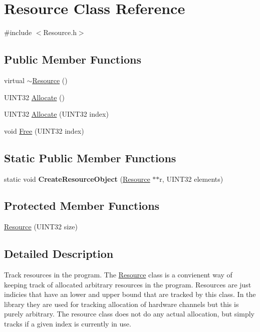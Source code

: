 \hypertarget{classResource}{\section{\-Resource \-Class \-Reference}
\label{classResource}
}


{\ttfamily \#include $<$\-Resource.\-h$>$}

\subsection*{\-Public \-Member \-Functions}
\begin{DoxyCompactItemize}
\item 
virtual \hyperlink{classResource_a0e5ec475e2601bdb33644468e86f6f10}{$\sim$\-Resource} ()
\item 
\-U\-I\-N\-T32 \hyperlink{classResource_ae3a993c7a656e97b51c77b1f7698ef3c}{\-Allocate} ()
\item 
\-U\-I\-N\-T32 \hyperlink{classResource_a502ca9f878a2c538fd0db89621033140}{\-Allocate} (\-U\-I\-N\-T32 index)
\item 
void \hyperlink{classResource_a1f8793fe4ecfcd6c4ae1417c3d0745ca}{\-Free} (\-U\-I\-N\-T32 index)
\end{DoxyCompactItemize}
\subsection*{\-Static \-Public \-Member \-Functions}
\begin{DoxyCompactItemize}
\item 
\hypertarget{classResource_ade155b92abe4ff2b0c43576434033922}{static void {\bfseries \-Create\-Resource\-Object} (\hyperlink{classResource}{\-Resource} $\ast$$\ast$r, \-U\-I\-N\-T32 elements)}\label{classResource_ade155b92abe4ff2b0c43576434033922}

\end{DoxyCompactItemize}
\subsection*{\-Protected \-Member \-Functions}
\begin{DoxyCompactItemize}
\item 
\hyperlink{classResource_a0b78cc75804fa191429da3cc501ad5ab}{\-Resource} (\-U\-I\-N\-T32 size)
\end{DoxyCompactItemize}


\subsection{\-Detailed \-Description}
\-Track resources in the program. \-The \hyperlink{classResource}{\-Resource} class is a convienent way of keeping track of allocated arbitrary resources in the program. \-Resources are just indicies that have an lower and upper bound that are tracked by this class. \-In the library they are used for tracking allocation of hardware channels but this is purely arbitrary. \-The resource class does not do any actual allocation, but simply tracks if a given index is currently in use.


